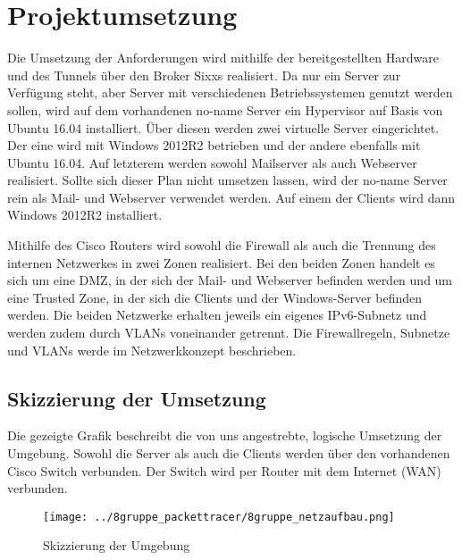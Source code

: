 \section{Projektumsetzung}

Die Umsetzung der Anforderungen wird mithilfe der bereitgestellten Hardware und des Tunnels über den Broker Sixxs realisiert. Da nur ein Server zur Verfügung steht, aber Server mit verschiedenen Betriebssystemen genutzt werden sollen, wird auf dem vorhandenen no-name Server ein Hypervisor auf Basis von Ubuntu 16.04 installiert. Über diesen werden zwei virtuelle Server eingerichtet. Der eine wird mit Windows 2012R2 betrieben und der andere ebenfalls mit Ubuntu 16.04. Auf letzterem werden sowohl Mailserver als auch Webserver realisiert. Sollte sich dieser Plan nicht umsetzen lassen, wird der no-name Server rein als Mail- und Webserver verwendet werden. Auf einem der Clients wird dann Windows 2012R2 installiert.

Mithilfe des Cisco Routers wird sowohl die Firewall als auch die Trennung des internen Netzwerkes in zwei Zonen realisiert. Bei den beiden Zonen handelt es sich um eine DMZ, in der sich der Mail- und Webserver befinden werden und um eine Trusted Zone, in der sich die Clients und der Windows-Server befinden werden. Die beiden Netzwerke erhalten jeweils ein eigenes IPv6-Subnetz und werden zudem durch VLANs voneinander getrennt. Die Firewallregeln, Subnetze und VLANs werde im Netzwerkkonzept beschrieben.

\subsection{Skizzierung der Umsetzung}

Die gezeigte Grafik beschreibt die von uns angestrebte, logische Umsetzung der Umgebung. Sowohl die Server als auch die Clients werden über den vorhandenen Cisco Switch verbunden. Der Switch wird per Router mit dem Internet (WAN) verbunden.


\begin{figure}[h]
\texttt{[image: ../8gruppe\_packettracer/8gruppe\_netzaufbau.png]}
\label{skizzierung-umsetzung}
\caption{Skizzierung der Umgebung}
\end{figure}


